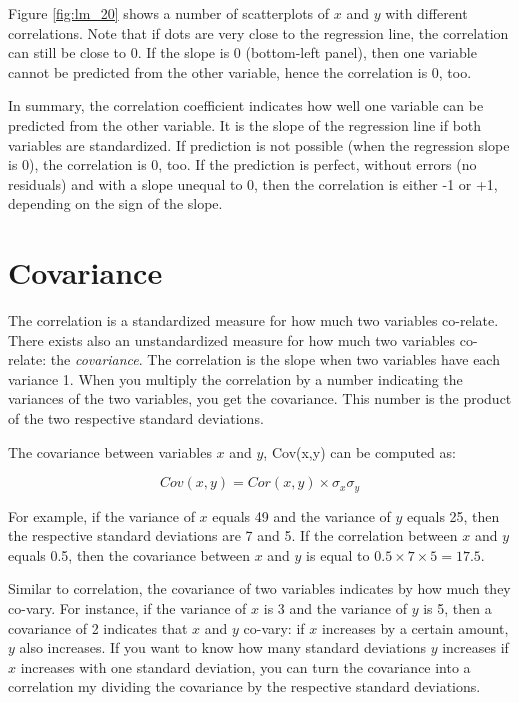 \documentclass[]{report}\usepackage[]{graphicx}\usepackage[]{color}
\begin{document}
Figure \ref{fig:lm_20} shows a number of scatterplots of $x$ and $y$ with different correlations. Note that if dots are very close to the regression line, the correlation can still be close to 0. If the slope is 0 (bottom-left panel), then one variable cannot be predicted from the other variable, hence the correlation is 0, too.

In summary, the correlation coefficient indicates how well one variable can be predicted from the other variable. It is the slope of the regression line if both variables are standardized. If prediction is not possible (when the regression slope is 0), the correlation is 0, too. If the prediction is perfect, without errors (no residuals) and with a slope unequal to 0, then the correlation is either -1 or +1, depending on the sign of the slope.

\section{Covariance}

The correlation is a standardized measure for how much two variables co-relate. There exists also an unstandardized measure for how much two variables co-relate: the \textit{covariance}. The correlation is the slope when two variables have each variance 1. When you multiply the correlation by a number indicating the variances of the two variables, you get the covariance. This number is the product of the two respective standard deviations.

The covariance between variables $x$ and $y$, Cov(x,y) can be computed as:


\begin{equation}
Cov(x,y)= Cor(x,y) \times \sigma_x \sigma_y
\end{equation}

For example, if the variance of $x$ equals 49 and the variance of $y$ equals 25, then the respective standard deviations are 7 and 5. If the correlation between $x$ and $y$ equals 0.5, then the covariance between $x$ and $y$ is equal to $0.5 \times 7 \times 5 = 17.5$.

Similar to correlation, the covariance of two variables indicates by how much they co-vary. For instance, if the variance of $x$ is 3 and the variance of $y$ is 5, then a covariance of 2 indicates that $x$ and $y$ co-vary: if $x$ increases by a certain amount, $y$ also increases. If you want to know how many standard deviations $y$ increases if $x$ increases with one standard deviation, you can turn the covariance into a correlation my dividing the covariance by the respective standard deviations.
\end{document}
